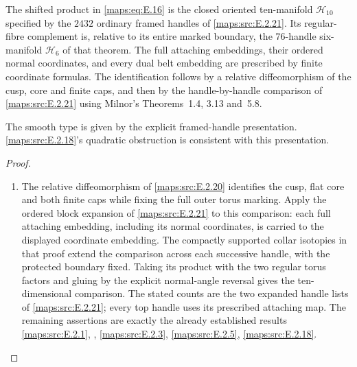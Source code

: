 \begin{proposition}\hypertarget{tag-02MO}{}\label{maps:src:E.2.4}


The shifted product in \eqref{maps:eq:E.16} is the closed oriented ten-manifold
$\mathcal H_{10}$ specified by the $2432$ ordinary framed handles
of \ref{maps:src:E.2.21}. Its regular-fibre complement is, relative to its entire
marked boundary, the $76$-handle six-manifold $\mathcal H_6$ of
that theorem. The full attaching embeddings, their ordered normal
coordinates, and every dual belt embedding are prescribed by
finite coordinate formulas. The identification follows by a
relative diffeomorphism of the cusp, core and finite caps,
and then by the handle-by-handle comparison of \ref{maps:src:E.2.21} using
Milnor's Theorems~1.4, 3.13 and~5.8. 

The smooth type is given by the explicit framed-handle presentation. \ref{maps:src:E.2.18}'s quadratic obstruction is consistent
with this presentation. 


\end{proposition}
\begin{proof}
\begin{enumerate}[label={$\langle1\rangle$\arabic*.},leftmargin=*]
\item The relative diffeomorphism of \cref{maps:src:E.2.20} identifies the cusp, flat core and both finite caps while fixing the full outer torus marking. Apply the ordered block expansion of \cref{maps:src:E.2.21} to this comparison: each full attaching embedding, including its normal coordinates, is carried to the displayed coordinate embedding. The compactly supported collar isotopies in that proof extend the comparison across each successive handle, with the protected boundary fixed. Taking its product with the two regular torus factors and gluing by the explicit normal-angle reversal gives the ten-dimensional comparison. The stated counts are the two expanded handle lists of \cref{maps:src:E.2.21}; every top handle uses its prescribed attaching map. The remaining assertions are exactly the already established results \cref{maps:src:E.2.1}, , \cref{maps:src:E.2.3}, \cref{maps:src:E.2.5}, \cref{maps:src:E.2.18}.
\end{enumerate}
\end{proof}



